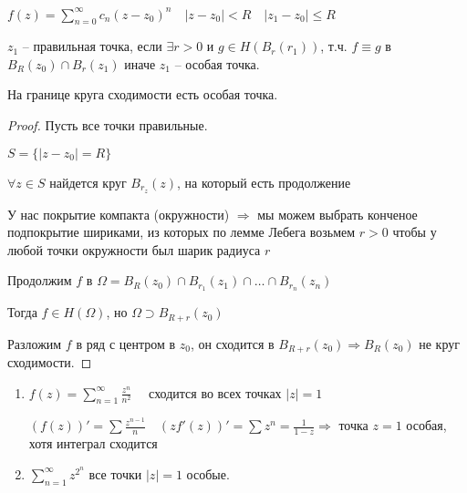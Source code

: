 \begin{definition}\thmslashn
	
	$f(z) = \sum\limits_{n=0}^{\infty} c_n(z-z_0)^n \quad |z-z_0| < R \quad |z_1 - z_0| \leqslant R$
	
	$z_1$ -- правильная точка, если $\exists r > 0$ и $g \in H(B_r(r_1))$, т.ч. $f \equiv g$ в $B_R(z_0) \cap B_r(z_1)$ иначе $z_1$ -- особая точка.
	
\end{definition}

\begin{theorem}\thmslashn 
	
	На границе круга сходимости есть особая точка.
	
\end{theorem}

\begin{proof}\thmslashn
	
	Пусть все точки правильные. 
	
	$S = \{|z-z_0| = R\}$
	
	$\forall z \in S$ найдется круг $B_{r_z}(z)$, на который есть продолжение
	
	У нас покрытие компакта (окружности) $\Rightarrow$ мы можем выбрать конченое подпокрытие шириками, из которых по лемме Лебега возьмем $r>0$ чтобы у любой точки окружности был шарик радиуса $r$
	
	Продолжим $f$ в $\Omega = B_R(z_0) \cap B_{r_1}(z_1)\cap \ldots \cap B_{r_n}(z_n)$
	
	Тогда $f \in H(\Omega)$, но $\Omega \supset B_{R+r}(z_0)$
	
	Разложим $f$ в ряд с центром в $z_0$, он сходится в $B_{R+r}(z_0) \Rightarrow B_R(z_0)$ не круг сходимости.
	
\end{proof}

\begin{example}\thmslashn
	
	\begin{enumerate}
		\item 
		$f(z) = \sum\limits_{n=1}^{\infty} \frac{z^n}{n^2} \quad$ сходится во всех точках $|z| = 1$
		
		$(f(z))' = \sum \frac{z^{n-1}}{n} \quad (zf'(z))' = \sum z^n = \frac{1}{1-z} \Rightarrow$ точка $z = 1$ особая, хотя интеграл сходится
		
		\item
		$\sum\limits_{n=1}^{\infty} z^{2^n} $ все точки $|z| = 1$ особые.
		
	\end{enumerate}
	
\end{example}

